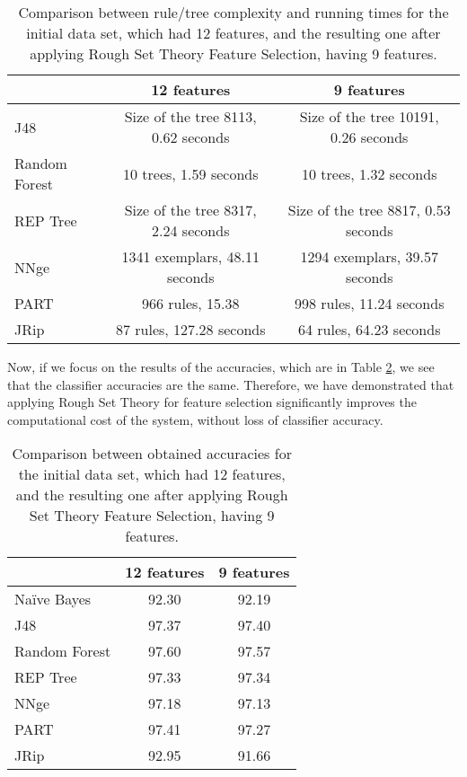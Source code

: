 \documentclass{llncs}
\begin{document}
\begin{table}[htpb]
\centering
 \caption{\label{tab_runningtimes} Comparison between rule/tree complexity and running times for the initial data set, which had 12 features, and the resulting one after applying Rough Set Theory Feature Selection, having 9 features.}
{\small
\begin{tabular}{|l|c|c|}
\cline{2-3}
\multicolumn{1}{l|}{} & 12 features & 9 features \\ 
\hline
J48 & Size of the tree 8113, 0.62 seconds & Size of the tree 10191, 0.26 seconds \\ 
\cline{1-1}
Random Forest & 10 trees, 1.59 seconds & 10 trees, 1.32 seconds \\
\cline{1-1}
REP Tree & Size of the tree 8317, 2.24 seconds & Size of the tree 8817, 0.53 seconds \\ 
\cline{1-1}
NNge & 1341 exemplars, 48.11 seconds & 1294 exemplars, 39.57 seconds \\ 
\cline{1-1}
PART & 966 rules, 15.38 & 998 rules, 11.24 seconds \\ 
\cline{1-1}
JRip & 87 rules, 127.28 seconds & 64 rules, 64.23 seconds \\ 
\hline
\end{tabular}
}
\end{table}

Now, if we focus on the results of the accuracies, which are in Table \ref{tab_12featvs9feat}, we see that the classifier accuracies are the same. Therefore, we have demonstrated that applying Rough Set Theory for feature selection significantly improves the computational cost of the system, without loss of classifier accuracy.

\begin{table}[htpb]
\centering
 \caption{\label{tab_12featvs9feat} Comparison between obtained accuracies for the initial data set, which had 12 features, and the resulting one after applying Rough Set Theory Feature Selection, having 9 features.}
{\small
\begin{tabular}{|l|c|c|}
\cline{2-3}
\multicolumn{1}{l|}{} & 12 features & 9 features \\ 
\hline
Naïve Bayes & 92.30 & 92.19 \\ 
\cline{1-1}
J48 & 97.37 & 97.40 \\ 
\cline{1-1}
Random Forest & 97.60 & 97.57 \\
\cline{1-1}
REP Tree & 97.33 & 97.34 \\ 
\cline{1-1}
NNge & 97.18 & 97.13 \\ 
\cline{1-1}
PART & 97.41 & 97.27 \\ 
\cline{1-1}
JRip & 92.95 & 91.66 \\ 
\hline
\end{tabular}
}
\end{table}
\end{document}
